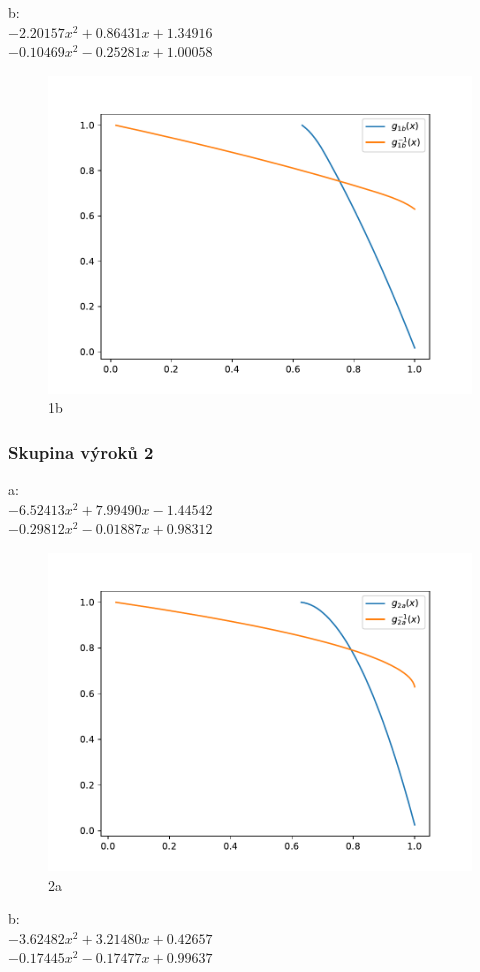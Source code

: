 b:\\
$-2.20157x^2+0.86431x+1.34916$\\
$-0.10469x^2-0.25281x+1.00058$\\

\begin{figure}[H]
    \caption{1b}
        \hspace{-1cm}
        \includegraphics[scale=0.5]{template-fig/p1.pdf}
        \centering
\end{figure}




\subsubsection{Skupina výrok\r u 2}
a:\\
$-6.52413x^2+7.99490x-1.44542$\\
$-0.29812x^2-0.01887x+0.98312$\\

\begin{figure}[H]
    \caption{2a}
        \hspace{-1cm}
        \includegraphics[scale=0.5]{template-fig/p2.pdf}
        \centering
\end{figure}
b:\\
$-3.62482x^2+3.21480x+0.42657$\\
$-0.17445x^2-0.17477x+0.99637$\\

